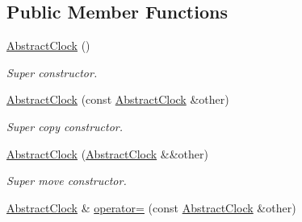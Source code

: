 \subsection*{Public Member Functions}
\begin{DoxyCompactItemize}
\item 
\hyperlink{classomi_1_1runtime_1_1_abstract_clock_a36bf3e030ee8096c0be9c85949dd281d}{Abstract\+Clock} ()\hypertarget{classomi_1_1runtime_1_1_abstract_clock_a36bf3e030ee8096c0be9c85949dd281d}{}\label{classomi_1_1runtime_1_1_abstract_clock_a36bf3e030ee8096c0be9c85949dd281d}

\begin{DoxyCompactList}\small\item\em Super constructor. \end{DoxyCompactList}\item 
\hyperlink{classomi_1_1runtime_1_1_abstract_clock_a7c0ab1571043a7475ed2214ec9aaf33a}{Abstract\+Clock} (const \hyperlink{classomi_1_1runtime_1_1_abstract_clock}{Abstract\+Clock} \&other)\hypertarget{classomi_1_1runtime_1_1_abstract_clock_a7c0ab1571043a7475ed2214ec9aaf33a}{}\label{classomi_1_1runtime_1_1_abstract_clock_a7c0ab1571043a7475ed2214ec9aaf33a}

\begin{DoxyCompactList}\small\item\em Super copy constructor. \end{DoxyCompactList}\item 
\hyperlink{classomi_1_1runtime_1_1_abstract_clock_ae09f0723a287c54fa3afeef09d7f4fba}{Abstract\+Clock} (\hyperlink{classomi_1_1runtime_1_1_abstract_clock}{Abstract\+Clock} \&\&other)\hypertarget{classomi_1_1runtime_1_1_abstract_clock_ae09f0723a287c54fa3afeef09d7f4fba}{}\label{classomi_1_1runtime_1_1_abstract_clock_ae09f0723a287c54fa3afeef09d7f4fba}

\begin{DoxyCompactList}\small\item\em Super move constructor. \end{DoxyCompactList}\item 
\hyperlink{classomi_1_1runtime_1_1_abstract_clock}{Abstract\+Clock} \& \hyperlink{classomi_1_1runtime_1_1_abstract_clock_a04cb4c8a300d2d15eef7bc5be43b45ea}{operator=} (const \hyperlink{classomi_1_1runtime_1_1_abstract_clock}{Abstract\+Clock} \&other)\hypertarget{classomi_1_1runtime_1_1_abstract_clock_a04cb4c8a300d2d15eef7bc5be43b45ea}{}\label{classomi_1_1runtime_1_1_abstract_clock_a04cb4c8a300d2d15eef7bc5be43b45ea}


\end{DoxyCompactItemize}
